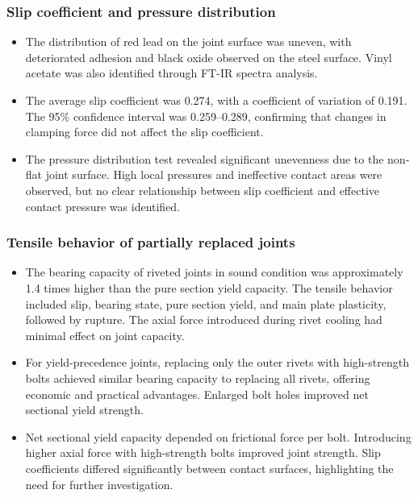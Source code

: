 \subsubsection*{Slip coefficient and pressure distribution}
\begin{itemize}
    \item The distribution of red lead on the joint surface was uneven, with deteriorated adhesion and black oxide observed on the steel surface. Vinyl acetate was also identified through FT-IR spectra analysis.
    \item The average slip coefficient was 0.274, with a coefficient of variation of 0.191. The 95\% confidence interval was 0.259–0.289, confirming that changes in clamping force did not affect the slip coefficient.
    \item The pressure distribution test revealed significant unevenness due to the non-flat joint surface. High local pressures and ineffective contact areas were observed, but no clear relationship between slip coefficient and effective contact pressure was identified.
\end{itemize}

\subsubsection*{Tensile behavior of partially replaced joints}
\begin{itemize}
    \item The bearing capacity of riveted joints in sound condition was approximately 1.4 times higher than the pure section yield capacity. The tensile behavior included slip, bearing state, pure section yield, and main plate plasticity, followed by rupture. The axial force introduced during rivet cooling had minimal effect on joint capacity.
    \item For yield-precedence joints, replacing only the outer rivets with high-strength bolts achieved similar bearing capacity to replacing all rivets, offering economic and practical advantages. Enlarged bolt holes improved net sectional yield strength.
    \item Net sectional yield capacity depended on frictional force per bolt. Introducing higher axial force with high-strength bolts improved joint strength. Slip coefficients differed significantly between contact surfaces, highlighting the need for further investigation.
\end{itemize}
